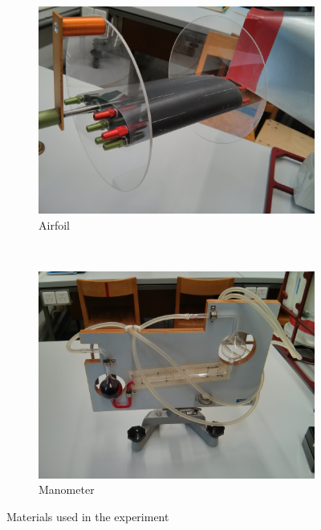 \documentclass{scrreprt}
\begin{document}
\begin{figure}[H]
        \begin{subfigure}[b]{0.45\textwidth}
                \centering
                \includegraphics[width=\textwidth]{img/airfoil.jpg}
                \caption{Airfoil}
                \label{fig:airfoil}
        \end{subfigure}%
        ~
        \begin{subfigure}[b]{0.45\textwidth}
                \centering
                \includegraphics[width=\textwidth]{img/manometer.jpg}
                \caption{Manometer}
                \label{fig:manometer}
        \end{subfigure}
        \caption{Materials used in the experiment}\label{fig:materials}
\end{figure}
\end{document}
